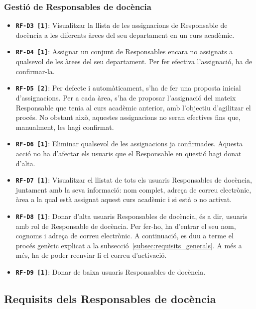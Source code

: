 \documentclass[a4paper,12pt]{ThesisStyle}
\begin{document}
\subsubsection{Gestió de Responsables de docència}
\begin{itemize}
  \item \texttt{\textbf{RF-D3 [1]}}: Visualitzar la llista de les assignacions de Responsable de docència a les diferents àrees del seu departament en un curs acadèmic.
  \item \texttt{\textbf{RF-D4 [1]}}: Assignar un conjunt de Responsables encara no assignats a qualsevol de les àrees del seu departament. Per fer efectiva l'assignació, ha de confirmar-la.
  \item \texttt{\textbf{RF-D5 [2]}}: Per defecte i automàticament, s'ha de fer una proposta inicial d'assignacions. Per a cada àrea, s'ha de proposar l'assignació del mateix Responsable que tenia al curs acadèmic anterior, amb l'objectiu d'agilitzar el procés. No obstant això, aquestes assignacions no seran efectives fins que, manualment, les hagi confirmat.
  \item \texttt{\textbf{RF-D6 [1]}}: Eliminar qualsevol de les assignacions ja confirmades. Aquesta acció no ha d'afectar els usuaris que el Responsable en qüestió hagi donat d'alta.
  \item \texttt{\textbf{RF-D7 [1]}}: Visualitzar el llistat de tots els usuaris Responsables de docència, juntament amb la seva informació: nom complet, adreça de correu electrònic, àrea a la qual està assignat aquest curs acadèmic i si està o no activat.
  \item \texttt{\textbf{RF-D8 [1]}}: Donar d'alta usuaris Responsables de docència, és a dir, usuaris amb rol de Responsable de docència. Per fer-ho, ha d'entrar el seu nom, cognoms i adreça de correu electrònic. A continuació, es duu a terme el procés genèric explicat a la subsecció~\ref{subsec:requisits_generals}. A més a més, ha de poder reenviar-li el correu d'activació.
  \item \texttt{\textbf{RF-D9 [1]}}: Donar de baixa usuaris Responsables de docència.
\end{itemize}

\subsection{Requisits dels Responsables de docència} %
\label{subsec:requisits_responsables_docencia}
\end{document}

